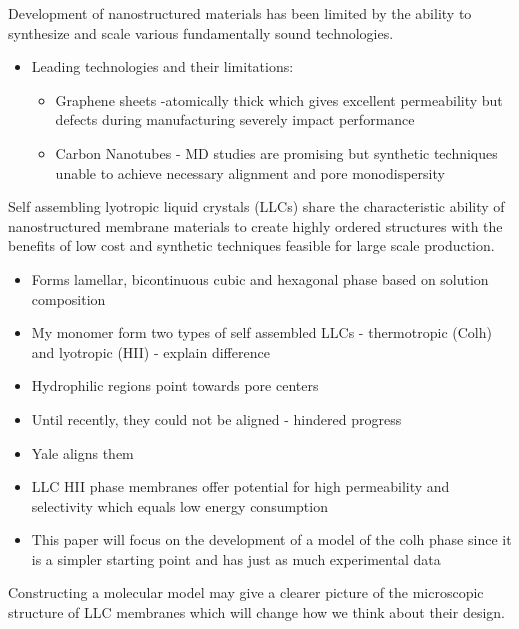 \documentclass{article}
\begin{document}
	Development of nanostructured materials has been limited by the ability to synthesize and scale various fundamentally sound technologies.
	\begin{itemize}
		\item Leading technologies and their limitations:
		\begin{itemize}
			\item Graphene sheets -atomically thick which gives excellent permeability but defects during manufacturing severely impact performance
			\item Carbon Nanotubes - MD studies are promising but synthetic techniques unable to achieve necessary alignment and pore monodispersity
		\end{itemize}
	\end{itemize} 
	Self assembling lyotropic liquid crystals (LLCs) share the characteristic ability of nanostructured membrane materials to create highly ordered structures with the benefits of low cost and synthetic techniques feasible for large scale production.
	\begin{itemize}
		\item Forms lamellar, bicontinuous cubic and hexagonal phase based on solution composition
		\item My monomer form two types of self assembled LLCs - thermotropic (Colh) and lyotropic (HII) - explain difference %
		\item Hydrophilic regions point towards pore centers
		\item Until recently, they could not be aligned - hindered progress
		\item Yale aligns them
		\item LLC HII phase membranes offer potential for high permeability and selectivity which equals low energy consumption
		\item This paper will focus on the development of a model of the colh phase since it is a simpler starting point and has just as much experimental data
	\end{itemize}
	Constructing a molecular model may give a clearer picture of the microscopic structure of LLC membranes which will change how we think about their design.
\end{document}
